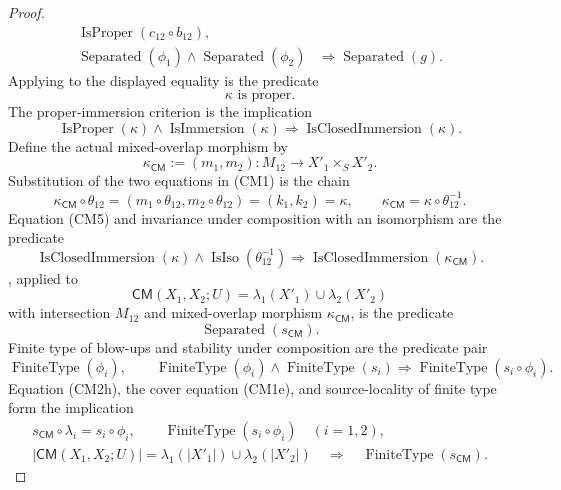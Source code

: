 \begin{proof}
\[\begin{aligned}
        \operatorname{IsProper}(c_{12}\circ b_{12}),\\
    \operatorname{Separated}(\phi_1)
      \wedge\operatorname{Separated}(\phi_2)
      &\Longrightarrow\operatorname{Separated}(g).
  \end{aligned}
  \]
  Applying
   to the displayed equality
  is the predicate
  \[
    \kappa\text{ is proper}.
  \]
  The proper-immersion criterion is the implication
  \[
    \operatorname{IsProper}(\kappa)
      \wedge\operatorname{IsImmersion}(\kappa)
      \Longrightarrow\operatorname{IsClosedImmersion}(\kappa).
  \]
  Define the actual mixed-overlap morphism by
  \[
    \kappa_{\mathsf{CM}}:=(m_1,m_2)\colon
      M_{12}\longrightarrow X'_1\times_SX'_2.
  \]
  Substitution of the two equations in (CM1) is the chain
  \[
    \kappa_{\mathsf{CM}}\circ\theta_{12}
      =(m_1\circ\theta_{12},m_2\circ\theta_{12})
      =(k_1,k_2)=\kappa,
    \qquad
    \kappa_{\mathsf{CM}}=\kappa\circ\theta_{12}^{-1}.            \tag{CM5}
  \]
  Equation (CM5) and invariance under composition with an isomorphism are the
  predicate
  \[
    \operatorname{IsClosedImmersion}(\kappa)
      \wedge\operatorname{IsIso}(\theta_{12}^{-1})
      \Longrightarrow
        \operatorname{IsClosedImmersion}(\kappa_{\mathsf{CM}}).
  \]
  , applied to
  \[
    \mathsf{CM}(X_1,X_2;U)=\lambda_1(X'_1)\cup\lambda_2(X'_2)
  \]
  with intersection $M_{12}$ and mixed-overlap morphism
  $\kappa_{\mathsf{CM}}$, is the predicate
  \[
    \operatorname{Separated}(s_{\mathsf{CM}}).
  \]
  Finite type of blow-ups and stability under composition are the predicate
  pair
  \[
    \operatorname{FiniteType}(\phi_i),\qquad
    \operatorname{FiniteType}(\phi_i)
      \wedge\operatorname{FiniteType}(s_i)
      \Longrightarrow\operatorname{FiniteType}(s_i\circ\phi_i).
  \]
  Equation (CM2h), the cover equation (CM1e), and source-locality of finite
  type form the implication
  \[
  \begin{gathered}
    s_{\mathsf{CM}}\circ\lambda_i=s_i\circ\phi_i,
    \qquad
    \operatorname{FiniteType}(s_i\circ\phi_i)\quad(i=1,2),\\
    |\mathsf{CM}(X_1,X_2;U)|
      =\lambda_1(|X'_1|)\cup\lambda_2(|X'_2|)
      \quad\Longrightarrow\quad
    \operatorname{FiniteType}(s_{\mathsf{CM}}).
  \end{gathered}
  \]
\end{proof}

